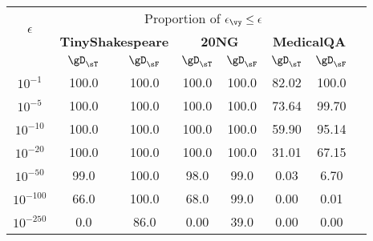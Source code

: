 

\begin{tabular}{c c c c c c c c}
\toprule
\multirow{2}{*}{\textbf{$\epsilon$}} & \multicolumn{6}{c}{Proportion of $\epsilon_{\vy}\leq \epsilon$} (in \%) \\
\cmidrule(lr){2-7}
 & \multicolumn{2}{c}{\textbf{TinyShakespeare}} & \multicolumn{2}{c}{\textbf{20NG}} & \multicolumn{2}{c}{\textbf{MedicalQA}} \\
\cmidrule(lr){2-3} \cmidrule(lr){4-5} \cmidrule(lr){6-7}
  & $\gD_{\sT}$ & $\gD_{\sF}$ & $\gD_{\sT}$ & $\gD_{\sF}$ & $\gD_{\sT}$ & $\gD_{\sF}$ \\
\midrule
\textbf{$10^{-1}$} & 100.0 & 100.0 & 100.0 & 100.0 & 82.02 & 100.0 \\
\textbf{$10^{-5}$}  & 100.0 & 100.0 & 100.0 & 100.0 & 73.64 & 99.70 \\
\textbf{$10^{-10}$}  & 100.0 & 100.0 & 100.0 & 100.0 & 59.90 & 95.14 \\
\textbf{$10^{-20}$}  & 100.0 & 100.0 & 100.0 & 100.0 & 31.01 & 67.15 \\
\textbf{$10^{-50}$}  & 99.0 & 100.0 & 98.0 & 99.0 & 0.03 & 6.70 \\
\textbf{$10^{-100}$}  & 66.0 & 100.0 & 68.0 & 99.0 & 0.00 & 0.01 \\
\textbf{$10^{-250}$}  & 0.0 & 86.0 & 0.00 & 39.0 & 0.00 & 0.00 \\
\bottomrule
\end{tabular}